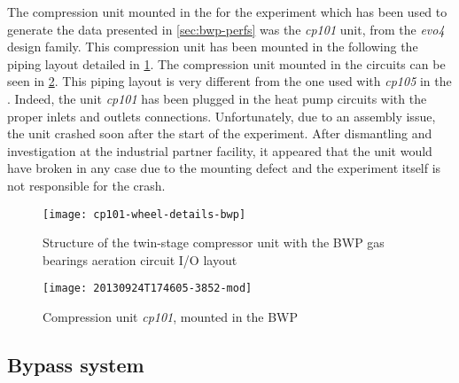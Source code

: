 The compression unit mounted in the \BWP{} for the experiment which
has been used to generate the data presented in \cref{sec:bwp-perfs}
was the \textit{cp101} unit, from the \textit{evo4} design
family. This compression unit has been mounted
in the \BWP{} following the piping layout detailed in
\cref{fig:cp101-struct-bwp}. The compression unit mounted in the
circuits can be seen in \cref{fig:bwp-cp101-mounted}. This piping
layout is very different from the one used with \textit{cp105} in the
\AWP{}. Indeed, the unit \textit{cp101} has been plugged in the heat
pump circuits with the proper inlets and outlets
connections. Unfortunately, due to an assembly issue, the unit crashed
soon after the start of the experiment. After dismantling and
investigation at the industrial partner facility, it appeared that the
unit would have broken in any case due to the mounting defect and the
experiment itself is not responsible for the crash.

\begin{figure}
  \centering
  \texttt{[image: cp101-wheel-details-bwp]}
  \caption[Structure of the compressor unit with the BWP gas bearings
  aeration circuit I/O layout]{Structure of the twin-stage compressor
    unit with the BWP gas bearings aeration circuit I/O layout}
  \label{fig:cp101-struct-bwp}
\end{figure}

\begin{figure}
  \centering
  \texttt{[image: 20130924T174605-3852-mod]}
  \caption{Compression unit \textit{cp101}, mounted in the BWP}
  \label{fig:bwp-cp101-mounted}
\end{figure}

\subsection{Bypass system}
\label{sec:bwp-bypass-system}

